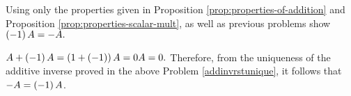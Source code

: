 \begin{enumialphparenastyle}
\begin{ex} Using only the properties given in Proposition \ref{prop:properties-of-addition} and 
Proposition \ref{prop:properties-scalar-mult}, as well as previous
problems show $\left(-1\right) A=-A.$
\begin{sol}
$A+\left(-1\right) A=\left(1+\left(
-1\right) \right) A=0A=0.$ Therefore, from the uniqueness of the additive
inverse proved in the above Problem \ref{addinvrstunique}, it follows that $
-A=\left(-1\right) A$.
\end{sol}
\end{ex}

\end{enumialphparenastyle}